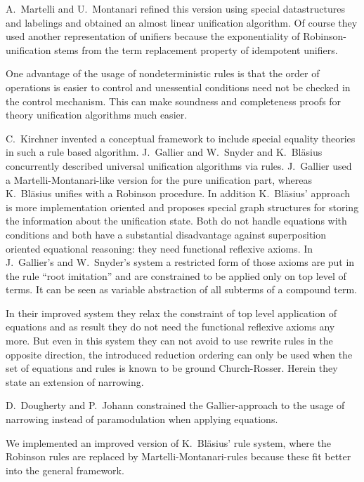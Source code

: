 A.\ Martelli and U.\ Montanari refined this version using special
datastructures and labelings and obtained an almost linear
unification algorithm. Of course they used another representation of
unifiers because the exponentiality of Robinson-unification stems from 
the term replacement
property of idempotent unifiers.

One advantage of the usage of nondeterministic rules is
that the order of operations is easier to control and
unessential conditions need not be checked in the
control mechanism. This can make soundness and
completeness proofs for theory unification
algorithms much easier.

C.\ Kirchner \cite{Kirchner85} invented a conceptual framework to include 
special equality theories in such a rule based algorithm. J.\ Gallier and
W.\ Snyder
\cite{GaSn89} and K.\ Bl\"asius \cite{Blaesius86} concurrently 
described universal 
unification algorithms via rules. J.\ Gallier used a Martelli-Montanari-like
version for the pure unification part, whereas K.\ Bl\"asius unifies with a
Robinson procedure. In addition K.\ Bl\"asius' approach is more 
implementation
oriented and proposes special graph structures for storing the information
about the unification state.
Both do not handle equations with conditions and both have a substantial 
disadvantage against superposition oriented equational reasoning: they need 
functional reflexive axioms. In J.\ Gallier's and W.\ Snyder's system a restricted 
form of those axioms are put in the rule ``root imitation'' and are constrained 
to be applied only on top level of terms. It can be seen as variable abstraction
of all subterms of a compound term.

In their improved system they relax the constraint of top level application of
equations and as result they do not need the functional reflexive axioms any more. 
But even in this system they can not avoid to use rewrite rules in the opposite
direction, the introduced reduction ordering can only be used when the set
of equations and rules is known to be ground Church-Rosser. Herein they
state an extension of narrowing.

D.\ Dougherty and P.\ Johann \cite{DoJo90} constrained the Gallier-approach
to the usage of narrowing instead of paramodulation when applying
equations.

We implemented
an improved version of K.\ Bl\"asius'
rule system, where the Robinson rules are
replaced by Martelli-Montanari-rules because these fit better into the
general framework.


